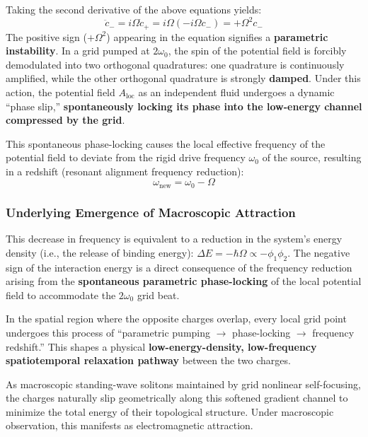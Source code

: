 \documentclass[12pt, a4paper]{article}
\begin{document}
Taking the second derivative of the above equations yields:
\begin{equation}
\ddot{c}_- = i \Omega \dot{c}_+ = i \Omega (-i \Omega c_-) = +\Omega^2 c_-
\end{equation}
The positive sign ($+\Omega^2$) appearing in the equation signifies a \textbf{parametric instability}. In a grid pumped at $2\omega_0$, the spin of the potential field is forcibly demodulated into two orthogonal quadratures: one quadrature is continuously amplified, while the other orthogonal quadrature is strongly \textbf{damped}. Under this action, the potential field $A_{\mathrm{loc}}$ as an independent fluid undergoes a dynamic ``phase slip,'' \textbf{spontaneously locking its phase into the low-energy channel compressed by the grid}.

This spontaneous phase-locking causes the local effective frequency of the potential field to deviate from the rigid drive frequency $\omega_0$ of the source, resulting in a redshift (resonant alignment frequency reduction):
\begin{equation}
\omega_{\mathrm{new}} = \omega_0 - \Omega
\end{equation}

\subsubsection{Underlying Emergence of Macroscopic Attraction}

This decrease in frequency is equivalent to a reduction in the system's energy density (i.e., the release of binding energy): $\Delta E = -\hbar \Omega \propto -\phi_1 \phi_2$. The negative sign of the interaction energy is a direct consequence of the frequency reduction arising from the \textbf{spontaneous parametric phase-locking} of the local potential field to accommodate the $2\omega_0$ grid beat.

In the spatial region where the opposite charges overlap, every local grid point undergoes this process of ``parametric pumping $\to$ phase-locking $\to$ frequency redshift.'' This shapes a physical \textbf{low-energy-density, low-frequency spatiotemporal relaxation pathway} between the two charges.

As macroscopic standing-wave solitons maintained by grid nonlinear self-focusing, the charges naturally slip geometrically along this softened gradient channel to minimize the total energy of their topological structure. Under macroscopic observation, this manifests as electromagnetic attraction.
\end{document}
